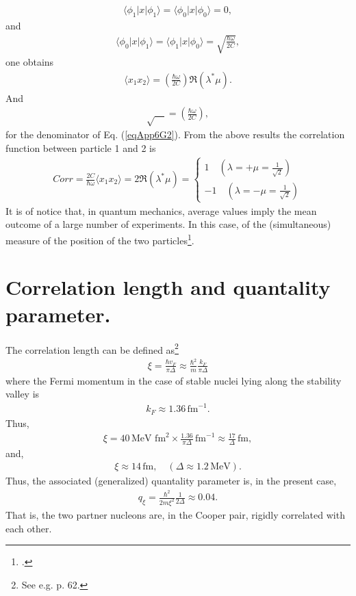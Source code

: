 \begin{subappendices}
\begin{align}\label{eqApp6G4}
\langle\phi_1|x|\phi_1\rangle=\langle\phi_0|x|\phi_0\rangle=0,
\end{align} 
and
\begin{align}\label{eqApp6G5}
\langle\phi_0|x|\phi_1\rangle=\langle\phi_1|x|\phi_0\rangle=\sqrt{\frac{\hbar\omega}{2C}},
\end{align}
one obtains
\begin{align}\label{eqApp6G6}
\langle x_1x_2\rangle=\left(\frac{\hbar\omega}{2C}\right)\Re(\lambda^*\mu).
\end{align} 
And 
\begin{align}\label{eqApp6G7}
\sqrt{\quad}=\left(\frac{\hbar\omega}{2C}\right),
\end{align}
for the denominator of Eq. (\ref{eqApp6G2}).
From the above results the correlation function between particle 1 and 2 is
\begin{align}\label{eqApp6G8}
Corr=\frac{2C}{\hbar\omega}\langle x_1x_2\rangle=2\Re(\lambda^*\mu)=
\left\{
\begin{array}{c}
 1\quad (\lambda=+\mu=\frac{1}{\sqrt{2}})\\ 
 -1 \quad (\lambda=-\mu=\frac{1}{\sqrt{2}})
\end{array}
\right. 
\end{align}
It is of notice that, in quantum mechanics, average values imply the mean outcome of a large number of experiments. In this case, of the (simultaneous) measure of the position of the two particles\footnote{\cite{Basdevant:05}.}.






\section{Correlation length and quantality parameter.}\label{App6H}
The correlation length can be defined as\footnote{See e.g. \cite{Annett:13} p. 62.}
\begin{align}\label{eqApp6H1}
\xi=\frac{\hbar v_F}{\pi\Delta}\approx\frac{\hbar^2}{m}\frac{k_F}{\pi\Delta}
\end{align}
where the Fermi momentum in the case of stable nuclei lying along the stability valley is
\begin{align}\label{eqApp6H2}
k_F\approx 1.36\,\text{fm}^{-1}.
\end{align}
Thus,
\begin{align}\label{eqApp6H3} 	
\xi=40\,\text{MeV fm}^2\times \frac{1.36}{\pi\Delta}\,\text{fm}^{-1}\approx \frac{17}{\Delta}\,\text{fm},
\end{align}
and,
\begin{align}\label{eqApp6H4}
\xi\approx 14\,\text{fm},\quad (\Delta\approx1.2\,\text{MeV}).
\end{align}
Thus, the associated (generalized) quantality parameter is, in the present case,
\begin{align}\label{eqApp6H8}
q_\xi=\frac{\hbar^2}{2m\xi^2}\frac{1}{2\Delta}\approx0.04.
\end{align} 
That is, the two partner nucleons are, in the Cooper pair, rigidly correlated with each other.




\end{subappendices}
